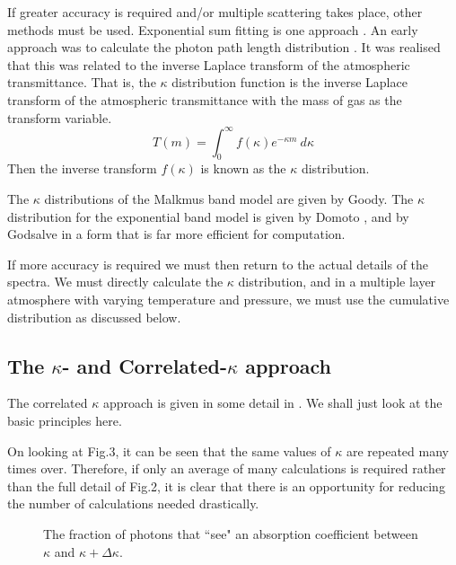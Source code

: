 \documentclass[12pt]{article}
\begin{document}
If greater accuracy is required and/or multiple scattering takes place, other 
methods must be used. Exponential sum fitting is one approach 
\cite{WisEvans:Mybib}. An early approach was to calculate the photon path length distribution \cite{WMIrvine:Mybib}  \cite{BakanQuenzel:Mybib} \cite{BakanKoepke:Mybib}. It was realised that this was related to the inverse Laplace transform of the atmospheric transmittance. That is, the $\kappa$ distribution function is the inverse Laplace transform of the atmospheric transmittance with the mass of gas as the transform variable.
\begin{equation}
T(m)=\int_0^\infty f(\kappa) e^{-\kappa m} \> d \kappa
\end{equation}
Then the  inverse transform  $f(\kappa)$ is known as the $\kappa$ distribution.

The $\kappa$ distributions of the Malkmus band model are given by Goody\cite{Goody:Mybib}. The $\kappa$ distribution for the exponential band model is given by Domoto \cite{Domoto:Mybib}, and by Godsalve 
\cite{GodsalveBand:Mybib} in a form that is far more efficient for computation.

If more accuracy is required we must then return to the actual details of the spectra. We must directly calculate the $\kappa$ distribution, and in a multiple layer atmosphere with varying temperature and pressure, we must use the cumulative distribution as discussed below.



\subsection{The $\kappa$- and Correlated-$\kappa$ approach}

The correlated $\kappa$ approach is given in some detail in \cite{GoodyWest:Mybib} \cite{LacisOinas:Mybib} \cite{FuLiou:Mybib} \cite{RoseKratz:Mybib} \cite{
MarinBuckuis:Mybib}. We shall just look at the basic principles here.

On looking at Fig.3, it can be seen that the same values of $\kappa$ are repeated
many times over. Therefore, if only an average of many calculations is required
rather than the full detail of Fig.2, it is clear that there is an opportunity
for reducing the number of calculations needed drastically.
\newpage
\vspace*{11cm}
\begin{figure}[htb]
\caption{ The fraction of photons that ``see" an
absorption coefficient between $\kappa$ and $\kappa+ \Delta \kappa$.}
\end{figure} 
\end{document}
